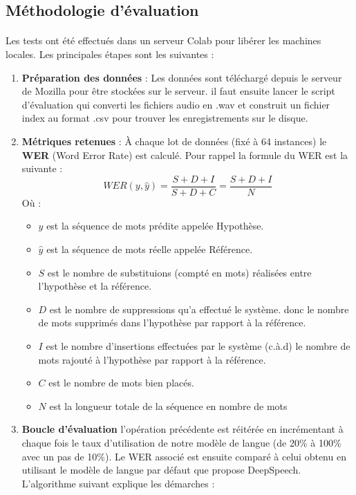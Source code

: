	\subsection{Méthodologie d'évaluation}
	\paragraph{}
	Les tests ont été effectués dans un serveur Colab pour libérer les machines locales. Les principales étapes sont les suivantes :  
	\begin{enumerate}
		\item \textbf{Préparation des données} : Les données sont téléchargé depuis le serveur de Mozilla pour être stockées sur le serveur. il faut ensuite lancer le script d'évaluation qui converti les fichiers audio en .wav et construit un fichier index au format .csv pour trouver les enregistrements sur le disque.
		\item \textbf{Métriques retenues} : À chaque lot de données (fixé à 64 instances) le \textbf{WER} (Word Error Rate) est calculé. Pour rappel la formule du WER est la suivante :
		\begin{equation*}
			WER(y,\hat{y}) = \frac{S+D+I}{S+D+C} = \frac{S+D+I}{N}
		\end{equation*}
		Où : 
		\begin{itemize}
			\item $y$ est la séquence de mots prédite appelée Hypothèse.
			\item $\hat{y}$ est la séquence de mots réelle appelée Référence.
			\item $S$ est le nombre de substituions (compté en mots) réalisées entre l'hypothèse et la référence.
			\item $D$ est le nombre de suppressions qu'a effectué le système. donc le nombre de mots supprimés dans l'hypothèse par rapport à la référence.
			\item $I$ est le nombre d'insertions effectuées par le système (c.à.d) le nombre de mots rajouté à l'hypothèse par rapport à la référence.
			\item $C$ est le nombre de mots bien placés.
			\item $N$ est la longueur totale de la séquence en nombre de mots
		\end{itemize}
		\item \textbf{Boucle d'évaluation} l'opération précédente est réitérée en incrémentant à chaque fois le taux d'utilisation de notre modèle de langue (de 20\% à 100\% avec un pas de 10\%). Le WER associé est ensuite comparé à celui obtenu en utilisant le modèle de langue par défaut que propose DeepSpeech. L'algorithme suivant explique les démarches :
	\end{enumerate}
